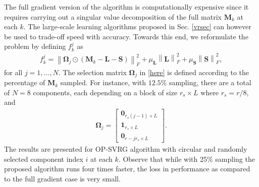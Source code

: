 \documentclass[draftcls,onecolumn,12pt]{IEEEtran}
\theoremstyle{plain}
\def\L{\mathbf{L}}
\def\M{\mathbf{M}}
\def \Ob {\boldsymbol{\Omega}}
\def\S{\mathbf{S}}
\providecommand{\norm}[1]{\left\|#1\right\|}
\theoremstyle{plain}
\theoremstyle{remark}
\begin{document}
The full gradient version of the algorithm is computationally expensive since it requires carrying out a singular value decomposition of the full matrix $\M_k$ at each $k$. The large-scale learning algorithms proposed in Sec. \ref{vrsec} can however be used to trade-off speed with accuracy. Towards this end, we reformulate the problem by defining $f_k^j$ as 
\begin{align}\label{here}
\!\!\!f_k^j = \norm{\Ob_j\odot(\M_k-\L-\S)}_F^2 + \mu_{\L}\norm{\L}_F^2 + \mu_{\S}\norm{\S}_F^2, 
\end{align}
for all $j = 1, \ldots, N$. The selection matrix $\Ob_j$ in \eqref{here} is defined according to the percentage of $\M_k$ sampled. For instance, with $12.5\%$ sampling, there are a total of $N = 8$ components, each depending on a block of size $r_s \times L$ where $r_s = r/8$, and
\begin{align}
\Ob_j = \begin{bmatrix} \mathbf{0}_{r_s(j-1) \times L} \\
\mathbf{1}_{r_s\times L} \\
\mathbf{0}_{r-jr_s\times L} 
\end{bmatrix}.
\end{align}
The results are presented for OP-SVRG algorithm with circular and randomly selected component index $i$ at each $k$. Observe that while with 25\% sampling the proposed algorithm runs four times faster, the loss in performance as compared to the full gradient case is very small.  
\end{document}
